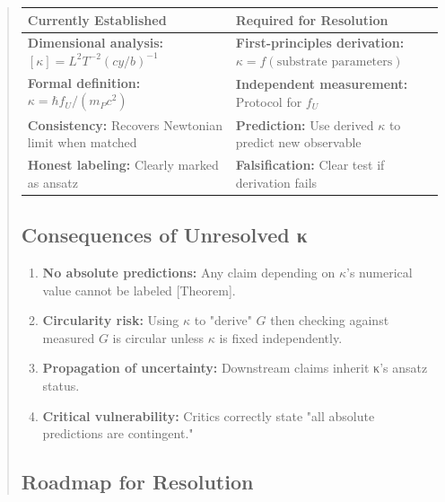 \documentclass[11pt,titlepage]{article}
\begin{document}
\begin{abstract}
\begin{tabular}{p{}p{}}
\textbf{Currently Established} & \textbf{Required for Resolution} \\ \hline
\textbf{Dimensional analysis:} $[\kappa] = L^2 T^{-2} (cy/b)^{-1}$ & \textbf{First-principles derivation:} $\kappa = f(\text{substrate parameters})$ \\
\textbf{Formal definition:} $\kappa = \hbar f_U / (m_P c^2)$ & \textbf{Independent measurement:} Protocol for $f_U$ \\
\textbf{Consistency:} Recovers Newtonian limit when matched & \textbf{Prediction:} Use derived $\kappa$ to predict new observable \\
\textbf{Honest labeling:} Clearly marked as ansatz & \textbf{Falsification:} Clear test if derivation fails \\
\end{tabular}

\subsection{Consequences of Unresolved κ}

\begin{enumerate}
\item \textbf{No absolute predictions:} Any claim depending on $\kappa$'s numerical value cannot be labeled [Theorem].

\item \textbf{Circularity risk:} Using $\kappa$ to "derive" $G$ then checking against measured $G$ is circular unless $\kappa$ is fixed independently.

\item \textbf{Propagation of uncertainty:} Downstream claims inherit κ's ansatz status.

\item \textbf{Critical vulnerability:} Critics correctly state "all absolute predictions are contingent."
\end{enumerate}

\subsection{Roadmap for Resolution}


\end{abstract}
\end{document}
